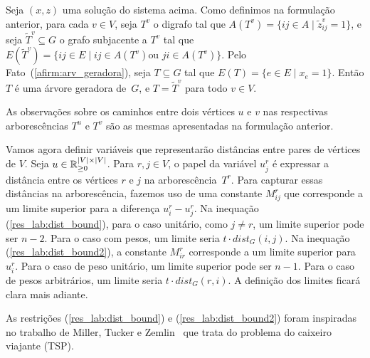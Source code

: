 \begin{lpformulation}[]
\end{lpformulation}


Seja $(x,z)$ uma solução do sistema acima.  Como definimos na
formulação anterior, para cada $v \in V$, seja $T^v$ o digrafo tal que
$A(T^{v}) = \{ij \in A\; |\; \tilde{z}^{v}_{ij} = 1\}$, e seja
$\widetilde{T}^{v} \subseteq G$ o grafo subjacente a $T^{v}$ tal que
\mbox{$E(\widetilde{T}^{v}) = \{ij \in E\; |\; ij \in A(T^{v}) \text{
    ou }ji \in A(T^{v})\}$}.  Pelo Fato~(\ref{afirm:arv_geradora}),
seja $T \subseteq G$ tal que $E(T) = \{e \in E \; |\; x_e =
1\}$. Então $T$ é uma árvore geradora de~$G$, e $T=\widetilde{T}^{v}$
para todo $v\in V$.
  

As observações sobre os caminhos entre dois vértices $u$ e $v$ nas
respectivas arborescências $T^{u}$ e $T^{v}$ são as mesmas apresentadas
na formulação anterior.

Vamos agora definir variáveis que representarão distâncias entre pares
de vértices de $V$.  Seja $u \in \mathbb{R}^{|V| \times |V|}_{\ge 0}$. Para $r,j \in V$, o papel
da variável $u^{r}_{j}$ é expressar a distância entre os vértices $r$
e $j$ na arborescência~$T^r$. Para capturar essas distâncias na
arborescência, fazemos uso de uma constante $M_{ij}^{r}$ que
corresponde a um limite superior para a diferença $u^r_i - u^r_j$. Na
inequação (\ref{res_lab:dist_bound}), para o caso unitário, como
$j \neq r$, um limite superior pode ser $n-2$. Para o caso com pesos,
um limite seria $t \cdot dist_{G}(i,j)$. Na inequação
(\ref{res_lab:dist_bound2}), a constante $M^r_{ir}$ corresponde a um
limite superior para $u^r_i$. Para o caso de peso unitário, um limite
superior pode ser $n-1$. Para o caso de pesos arbitrários, um limite
seria $t \cdot dist_{G}(r,i)$.  A definição dos limites ficará clara
mais adiante.


\begin{lpformulation}[]
\end{lpformulation}
As restrições (\ref{res_lab:dist_bound}) e (\ref{res_lab:dist_bound2}) foram
inspiradas no trabalho de Miller, Tucker e Zemlin~\cite{MillerTZ60}
que trata do problema do caixeiro viajante (TSP).

